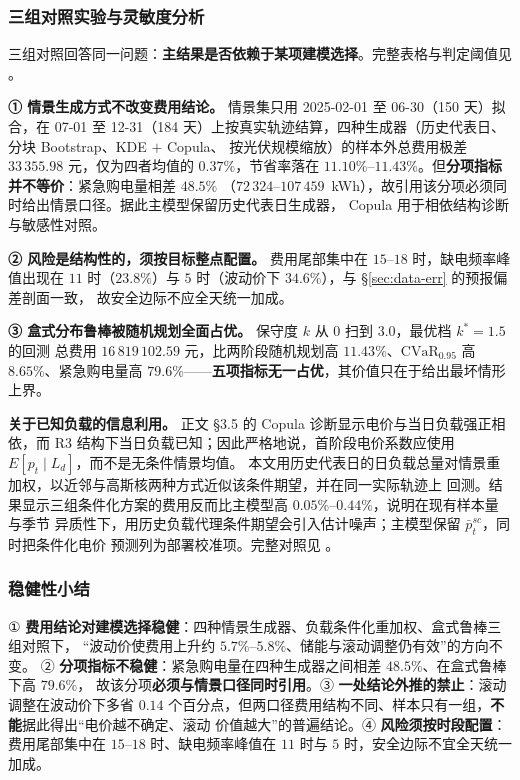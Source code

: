 \subsubsection{三组对照实验与灵敏度分析}

三组对照回答同一问题：\textbf{主结果是否依赖于某项建模选择}。完整表格与判定阈值见
。

\textbf{① 情景生成方式不改变费用结论。} 情景集只用 2025-02-01 至 06-30（150 天）拟合，在 07-01 至
12-31（184 天）上按真实轨迹结算，四种生成器（历史代表日、分块 Bootstrap、KDE \(+\) Copula、
按光伏规模缩放）的样本外总费用极差 \(33\,355.98\) 元，仅为四者均值的 \(0.37\%\)，节省率落在
\(11.10\%\)--\(11.43\%\)。但\textbf{分项指标并不等价}：紧急购电量相差 \(48.5\%\)
（\(72\,324\)--\(107\,459\)~kWh），故引用该分项必须同时给出情景口径。据此主模型保留历史代表日生成器，
Copula 用于相依结构诊断与敏感性对照。

\textbf{② 风险是结构性的，须按目标整点配置。} 费用尾部集中在 \(15\)--\(18\) 时，缺电频率峰值出现在
\(11\) 时（\(23.8\%\)）与 \(5\) 时（波动价下 \(34.6\%\)），与 \S\ref{sec:data-err} 的预报偏差剖面一致，
故安全边际不应全天统一加成。

\textbf{③ 盒式分布鲁棒被随机规划全面占优。} 保守度 \(k\) 从 0 扫到 3.0，最优档 \(k^{*}=1.5\) 的回测
总费用 \(16\,819\,102.59\) 元，比两阶段随机规划高 \(11.43\%\)、\(\mathrm{CVaR}_{0.95}\) 高
\(8.65\%\)、紧急购电量高 \(79.6\%\)——\textbf{五项指标无一占优}，其价值只在于给出最坏情形上界。

\textbf{关于已知负载的信息利用。} 正文 \S3.5 的 Copula 诊断显示电价与当日负载强正相依，而 R3
结构下当日负载已知；因此严格地说，首阶段电价系数应使用 \(E[p_t\mid L_d]\)，而不是无条件情景均值。
本文用历史代表日的日负载总量对情景重加权，以近邻与高斯核两种方式近似该条件期望，并在同一实际轨迹上
回测。结果显示三组条件化方案的费用反而比主模型高 \(0.05\%\)--\(0.44\%\)，说明在现有样本量与季节
异质性下，用历史负载代理条件期望会引入估计噪声；主模型保留 \(\bar p^{sc}_t\)，同时把条件化电价
预测列为部署校准项。完整对照见 。

\subsubsection{稳健性小结}
① \textbf{费用结论对建模选择稳健}：四种情景生成器、负载条件化重加权、盒式鲁棒三组对照下，
“波动价使费用上升约 \(5.7\%\)--\(5.8\%\)、储能与滚动调整仍有效”的方向不变。
② \textbf{分项指标不稳健}：紧急购电量在四种生成器之间相差 \(48.5\%\)、在盒式鲁棒下高 \(79.6\%\)，
故该分项\textbf{必须与情景口径同时引用}。③ \textbf{一处结论外推的禁止}：滚动调整在波动价下多省
\(0.14\) 个百分点，但两口径费用结构不同、样本只有一组，\textbf{不能}据此得出“电价越不确定、滚动
价值越大”的普遍结论。④ \textbf{风险须按时段配置}：费用尾部集中在 \(15\)--\(18\) 时、缺电频率峰值在
\(11\) 时与 \(5\) 时，安全边际不宜全天统一加成。
